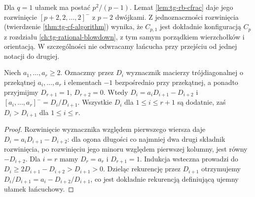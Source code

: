 \begin{uwaga}
Dla $q=1$ ułamek ma postać $p^2/(p-1)$.
Lemat \ref{lem:tg-rb-cfrac} daje jego rozwinięcie
$[p+2,2,\ldots,2]^-$ z $p-2$ dwójkami.
Z jednoznaczności rozwinięcia (twierdzenie
\ref{thm:tg-cf-algorithm}) wynika, że $C_{p,1}$
jest dokładnie konfiguracją $C_p$ z rozdziału
\ref{ch:tg-rational-blowdown}, z tym samym porządkiem
wierzchołków i orientacją. W szczególności nie
odwracamy łańcucha przy przejściu od jednej notacji
do drugiej.
\end{uwaga}

\begin{center}
\end{center}

\begin{lemat}
\label{lem:tg-general-minors}
Niech $a_1,\ldots,a_r\geq2$. Oznaczmy przez $D_i$ wyznacznik
macierzy trójdiagonalnej o przekątnej
$a_i,\ldots,a_r$ i elementach $-1$ bezpośrednio przy przekątnej,
a ponadto przyjmijmy $D_{r+1}=1$, $D_{r+2}=0$. Wtedy
$D_i=a_iD_{i+1}-D_{i+2}$ i
$[a_i,\ldots,a_r]^-=D_i/D_{i+1}$. Wszystkie $D_i$ dla
$1\leq i\leq r+1$ są dodatnie, zaś $D_i>D_{i+1}$ dla
$1\leq i\leq r$.
\end{lemat}

\begin{proof}
Rozwinięcie wyznacznika względem pierwszego wiersza daje
$D_i=a_iD_{i+1}-D_{i+2}$: dla ogona długości
co najmniej dwa drugi składnik rozwinięcia,
po rozwinięciu jego minoru względem pierwszej
kolumny, jest równy $-D_{i+2}$.
Dla $i=r$ mamy $D_r=a_r$ i
$D_{r+1}=1$. Indukcja wsteczna prowadzi do
$D_i\geq2D_{i+1}-D_{i+2}>D_{i+1}>0$.
Dzieląc rekurencję przez $D_{i+1}$ otrzymujemy
$D_i/D_{i+1}=a_i-D_{i+2}/D_{i+1}$, co jest dokładnie
rekurencją definiującą ujemny ułamek łańcuchowy.
\end{proof}

